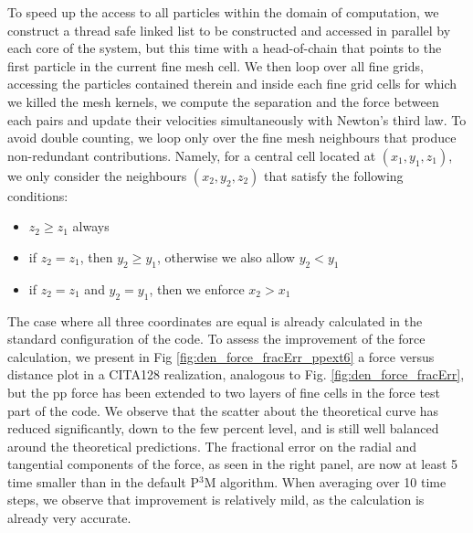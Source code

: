 \documentclass[useAMS,usenatbib]{mn2e}
\begin{document}
 To speed up the access to all particles within the domain of computation, we construct a thread safe linked list
 to be constructed and accessed in parallel by each core of the system, but this time with a head-of-chain that points to the first particle in the current fine mesh cell. We then loop over all fine grids, accessing the particles contained therein and inside each fine grid cells for which we killed the mesh kernels,
 we compute the separation and the force between each pairs and update their velocities simultaneously with Newton's third law. 
 To avoid double counting, we loop only over the fine mesh neighbours that produce non-redundant contributions. Namely, for a central cell located at 
 $(x_1, y_1, z_1)$, we only consider the neighbours $(x_2, y_2, z_2)$ that satisfy the following conditions:
 \begin{itemize}
 \item{$z_2 \ge z_1$ always}
 \item{if $z_2 = z_1$, then $y_2 \ge y_1$, otherwise we also allow $y_2 < y_1$} 
 \item{if $z_2 = z_1$ and $y_2 = y_1$, then we enforce $x_2 > x_1$}
 \end{itemize}
 The case where all three coordinates are equal is already calculated in the standard configuration of the code.
 To assess the improvement of the force calculation, we present in Fig \ref{fig:den_force_fracErr_ppext6} a force versus distance
 plot in a CITA128 realization, analogous to Fig. \ref{fig:den_force_fracErr}, but the pp force has been extended to  two layers of fine cells
 in the force test part of the code. 
 We observe that the scatter about the theoretical curve has reduced significantly, down to the few percent level, 
 and is still well balanced around the theoretical predictions.
 The fractional error on the radial and tangential components of the force, as seen in the right panel,
 are now at least 5 time smaller than in the default P$^{3}$M algorithm.
 When averaging over 10 time steps, we observe that improvement is relatively mild, as the calculation is already very accurate. 
 
\end{document}

